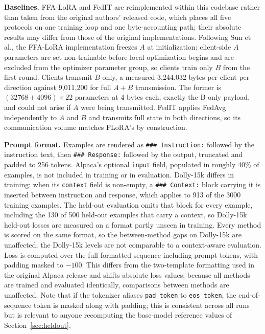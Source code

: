 \documentclass[iicol,pdflatex,sn-mathphys-num]{sn-jnl}
\begin{document}
\textbf{Baselines.} FFA-LoRA \cite{sun2024ffalora} and FedIT \cite{zhang2024federatedgpt} are reimplemented within this codebase rather than taken from the original authors' released code, which places all five protocols on one training loop and one byte-accounting path; their absolute results may differ from those of the original implementations. Following Sun et al., the FFA-LoRA implementation freezes $A$ at initialization: client-side $A$ parameters are set non-trainable before local optimization begins and are excluded from the optimizer parameter group, so clients train only $B$ from the first round. Clients transmit $B$ only, a measured 3{,}244{,}032 bytes per client per direction against 9{,}011{,}200 for full $A{+}B$ transmission. The former is $(32768 + 4096) \times 22$ parameters at 4 bytes each, exactly the B-only payload, and could not arise if $A$ were being transmitted. FedIT applies FedAvg independently to $A$ and $B$ and transmits full state in both directions, so its communication volume matches FLoRA's by construction.

\textbf{Prompt format.} Examples are rendered as \texttt{\#\#\# Instruction:} followed by the instruction text, then \texttt{\#\#\# Response:} followed by the output, truncated and padded to 256 tokens. Alpaca's optional \texttt{input} field, populated in roughly 40\% of examples, is not included in training or in evaluation. Dolly-15k differs in training: when its \texttt{context} field is non-empty, a \texttt{\#\#\# Context:} block carrying it is inserted between instruction and response, which applies to 913 of the 3000 training examples. The held-out evaluation omits that block for every example, including the 130 of 500 held-out examples that carry a context, so Dolly-15k held-out losses are measured on a format partly unseen in training. Every method is scored on the same format, so the between-method gaps on Dolly-15k are unaffected; the Dolly-15k levels are not comparable to a context-aware evaluation. Loss is computed over the full formatted sequence including prompt tokens, with padding masked to $-100$. This differs from the two-template formatting used in the original Alpaca release and shifts absolute loss values; because all methods are trained and evaluated identically, comparisons between methods are unaffected. Note that if the tokenizer aliases \texttt{pad\_token} to \texttt{eos\_token}, the end-of-sequence token is masked along with padding; this is consistent across all runs but is relevant to anyone recomputing the base-model reference values of Section~\ref{sec:heldout}.
\end{document}
